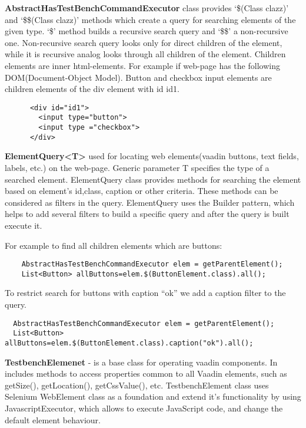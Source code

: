 \textbf{AbstractHasTestBenchCommandExecutor} class provides  `\$(Class clazz)'
and `\$\$(Class clazz)' methods which create a query for searching elements of
the given type.
 `\$' method builds a recursive search query and `\$\$' a non-recursive one.
 Non-recursive search query looks only for direct children of the element, while
 it is recursive analog looks through all children of the element. Children
 elements are inner html-elements.
   For example if web-page has the following DOM(Document-Object Model). 
   Button and checkbox input elements are children elements of the div element with id id1.
  \lstset{language=HTML}
    \begin{lstlisting}
      <div id="id1">
        <input type="button">
        <input type ="checkbox">
      </div>
  \end{lstlisting}
  
  
\textbf{ElementQuery<T>} used for locating web elements(vaadin buttons, text
fields, labels, etc.) on the web-page.
 Generic parameter T specifies the type of a searched element. 
 ElementQuery class provides methods for searching the element based on
 element's id,class, caption or other criteria. These methods can be considered as filters in the query.
 ElementQuery uses the Builder pattern, which helps to add several filters to build a specific query and after
 the query is built execute it.

For example to find all children elements which are buttons:
  \lstset{language=Java}
    \begin{lstlisting}
    AbstractHasTestBenchCommandExecutor elem = getParentElement();
    List<Button> allButtons=elem.$(ButtonElement.class).all();
  \end{lstlisting}
  
To restrict search for buttons with caption ``ok'' we add a caption filter to the query.
  \lstset{style=a1listing}
  \begin{lstlisting}
  AbstractHasTestBenchCommandExecutor elem = getParentElement();
  List<Button> allButtons=elem.$(ButtonElement.class).caption("ok").all();
  \end{lstlisting}
  
\textbf{TestbenchElemenet} - is a base class for operating vaadin components. In
includes methods to access properties common to all Vaadin elements, such as getSize(), getLocation(), getCssValue(), etc.
TestbenchElement class uses Selenium WebElement class as a foundation and extend
it's functionality by using JavascriptExecutor,
which allows to execute JavaScript code, and change the default element behaviour.

